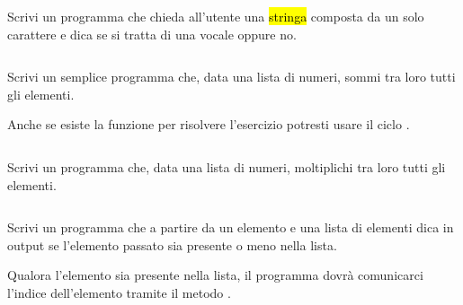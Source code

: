 \documentclass[a4paper,11pt,addpoints]{exam}
\begin{document}
\begin{questions}
    \questionspace

    \question[3]  Scrivi un programma che chieda all'utente una \hl{stringa}
    composta da un solo carattere e dica se si tratta di una vocale oppure no.

    \begin{solution}
        \small\inputminted{python}{solution/004.py}
    \end{solution}

    \questionspace

    \question[3]  Scrivi un semplice programma che, data una lista di numeri,
    sommi tra loro tutti gli elementi.

    \begin{tips}
        \item Anche se esiste la funzione  per risolvere l'esercizio potresti usare il ciclo .
    \end{tips}

    \begin{solution}
        \small\inputminted{python}{solution/005.py}
    \end{solution}

    \questionspace

    \question[3]  Scrivi un programma  che, data una lista di numeri,
    moltiplichi tra loro tutti gli elementi.

    \begin{solution}
        \small\inputminted{python}{solution/006.py}
    \end{solution}

    \questionspace

    \question[3]  Scrivi un programma che a partire da un elemento e una lista di elementi dica in output se
    l'elemento passato sia presente o meno nella lista.

    \begin{tips}
        \item Qualora l'elemento sia presente nella lista, il programma dovrà comunicarci
        l'indice dell'elemento tramite il metodo .
    \end{tips}

    \begin{solution}
        \small\inputminted{python}{solution/007.py}
    \end{solution}

    \questionspace


\end{questions}
\end{document}
